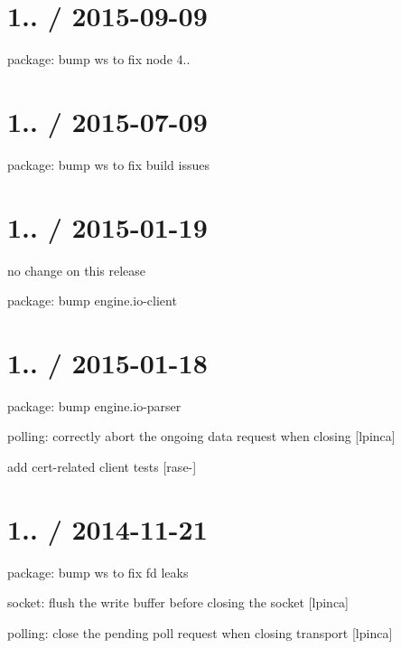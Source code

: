 \section*{1.. / 2015-\/09-\/09 }


\begin{DoxyItemize}
\item package\+: bump {\ttfamily ws} to fix node 4..
\end{DoxyItemize}

\section*{1.. / 2015-\/07-\/09 }


\begin{DoxyItemize}
\item package\+: bump {\ttfamily ws} to fix build issues
\end{DoxyItemize}

\section*{1.. / 2015-\/01-\/19 }


\begin{DoxyItemize}
\item no change on this release
\item package\+: bump {\ttfamily engine.\+io-\/client}
\end{DoxyItemize}

\section*{1.. / 2015-\/01-\/18 }


\begin{DoxyItemize}
\item package\+: bump {\ttfamily engine.\+io-\/parser}
\item polling\+: correctly abort the ongoing data request when closing \mbox{[}lpinca\mbox{]}
\item add cert-\/related client tests \mbox{[}rase-\/\mbox{]}
\end{DoxyItemize}

\section*{1.. / 2014-\/11-\/21 }


\begin{DoxyItemize}
\item package\+: bump {\ttfamily ws} to fix fd leaks
\item socket\+: flush the write buffer before closing the socket \mbox{[}lpinca\mbox{]}
\item polling\+: close the pending poll request when closing transport \mbox{[}lpinca\mbox{]}
\end{DoxyItemize}

